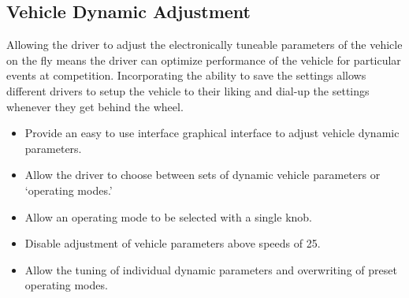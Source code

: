 \subsection{Vehicle Dynamic Adjustment}

Allowing the driver to adjust the electronically tuneable parameters of the vehicle on the fly means the driver can optimize performance of the vehicle for particular events at competition. Incorporating the ability to save the settings allows different drivers to setup the vehicle to their liking and dial-up the settings whenever they get behind the wheel.

\begin{itemize}
\item Provide an easy to use interface graphical interface to adjust vehicle dynamic parameters.
\item Allow the driver to choose between sets of dynamic vehicle parameters or `operating modes.'
\item Allow an operating mode to be selected with a single knob.
\item Disable adjustment of vehicle parameters above speeds of \unit{25}{\kilo\metre\per\hour}.
\item Allow the tuning of individual dynamic parameters and overwriting of preset operating modes.
\end{itemize}
